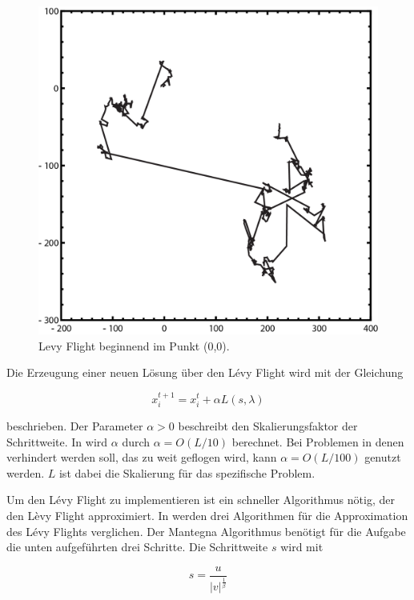 \documentclass[conference]{IEEEtran}
\begin{document}
      \begin{figure}
        \centering
        \includegraphics[width=0.8\linewidth]{LevyFlight.png}
        \caption{Levy Flight beginnend im Punkt (0,0).}
        \label{fig:levyFlight}
      \end{figure}


      Die Erzeugung einer neuen Lösung über den Lévy Flight wird mit der Gleichung

      \begin{equation}
      x_{i}^{t+1} = x_{i}^{t} + \alpha L(s, \lambda)\label{eq}
      \end{equation}

      beschrieben. Der Parameter $\alpha > 0$ beschreibt den Skalierungsfaktor der Schrittweite.  
      In \cite{b7} wird $\alpha$ durch $\alpha = O(L/10)$ berechnet. Bei Problemen in denen verhindert 
      werden soll, das zu weit geflogen wird, kann $\alpha = O(L/100)$ genutzt werden. $L$ ist dabei die 
      Skalierung für das spezifische Problem.

      Um den Lévy Flight zu implementieren ist ein schneller Algorithmus nötig, der den Lèvy Flight approximiert. 
      In \cite{b8} werden drei Algorithmen für die Approximation des Lévy Flights verglichen. Der 
      Mantegna Algorithmus benötigt für die Aufgabe die unten aufgeführten drei Schritte. Die Schrittweite $s$ wird mit
      
      \begin{equation}
        s = \frac{u}{|v|^{\frac{1}{\beta}}}\label{eq}
      \end{equation}
\end{document}

